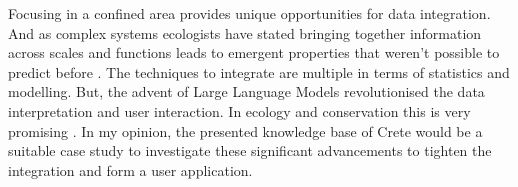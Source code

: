 Focusing in a confined area provides unique opportunities for data integration.
And as complex systems ecologists have stated bringing together information across
scales \parencite{brown2004METABOLIC} and functions leads to emergent properties that weren't possible to 
predict before \parencite{smith2016Origin}. The techniques to integrate are multiple in terms of statistics and modelling. But,
the advent of Large Language Models revolutionised the data interpretation and 
user interaction. In ecology and conservation this is very promising \parencite{doi2024biodiversity}.
In my opinion, the presented knowledge base of Crete would be a suitable 
case study to investigate these significant advancements to tighten the integration and form a 
user application.

